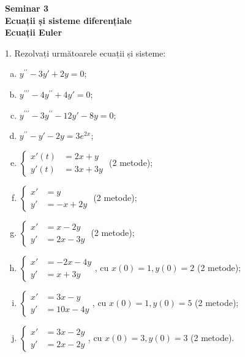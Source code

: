 \documentclass[11pt,a4paper]{article}
\theoremstyle{dotless}
\theoremstyle{dotlessdr}
\begin{document}

\begin{center}
  {\large\textbf{Seminar 3 \\
      Ecuații și sisteme diferențiale \\
      Ecuații Euler}}
\end{center}

\vspace{2cm}

1. Rezolvați următoarele ecuații și sisteme:
\begin{enumerate}[(a)]
\item $y^{\prime\prime} - 3y' + 2y = 0$;
\item $y^{\prime\prime\prime} - 4y^{\prime\prime} + 4y' = 0$;
\item $y^{\prime\prime\prime} - 3y^{\prime\prime} - 12y' - 8y = 0$;
\item $y^{\prime\prime} - y' - 2y = 3e^{2x}$;
\item 
  $\begin{cases}
    x'(t) &= 2x + y \\
    y'(t) &= 3x + 3y
  \end{cases}$ (2 metode);
\item $\begin{cases}
    x' &= y \\
    y' &= -x + 2y
  \end{cases}$ (2 metode);
\item $\begin{cases}
    x' &= x-2y \\
    y' &= 2x - 3y
  \end{cases}$ (2 metode);
\item $\begin{cases}
    x' &= -2x - 4y \\
    y' &= x + 3y
  \end{cases}$, cu $x(0) = 1, y(0) = 2$ (2 metode);
\item $\begin{cases}
    x' &= 3x - y \\
    y' &= 10x - 4y
  \end{cases}$, cu $x(0) = 1, y(0) = 5$ (2 metode);
\item $\begin{cases}
    x' &= 3x - 2y \\
    y' &= 2x - 2y
  \end{cases}$, cu $x(0) = 3, y(0) = 3$ (2 metode).
\end{enumerate}
\end{document}
